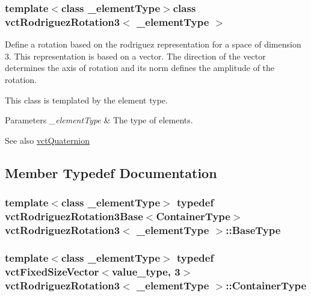 \subsubsection*{template$<$class \+\_\+element\+Type$>$class vct\+Rodriguez\+Rotation3$<$ \+\_\+element\+Type $>$}

Define a rotation based on the rodriguez representation for a space of dimension 3. This representation is based on a vector. The direction of the vector determines the axis of rotation and its norm defines the amplitude of the rotation. 

This class is templated by the element type.


\begin{DoxyParams}{Parameters}
{\em \+\_\+element\+Type} & The type of elements.\\
\hline
\end{DoxyParams}
\begin{DoxySeeAlso}{See also}
\hyperlink{classvct_quaternion}{vct\+Quaternion} 
\end{DoxySeeAlso}


\subsection{Member Typedef Documentation}
\hypertarget{classvct_rodriguez_rotation3_a9808e8703a58127607921c08914bda40}{}
\subsubsection[{Base\+Type}]{\setlength{\rightskip}{0pt plus 5cm}template$<$class \+\_\+element\+Type$>$ typedef {\bf vct\+Rodriguez\+Rotation3\+Base}$<${\bf Container\+Type}$>$ {\bf vct\+Rodriguez\+Rotation3}$<$ \+\_\+element\+Type $>$\+::{\bf Base\+Type}}\label{classvct_rodriguez_rotation3_a9808e8703a58127607921c08914bda40}
\hypertarget{classvct_rodriguez_rotation3_a14522bb406d3c5c520025d6f1c5f0a82}{}
\subsubsection[{Container\+Type}]{\setlength{\rightskip}{0pt plus 5cm}template$<$class \+\_\+element\+Type$>$ typedef {\bf vct\+Fixed\+Size\+Vector}$<$value\+\_\+type, 3$>$ {\bf vct\+Rodriguez\+Rotation3}$<$ \+\_\+element\+Type $>$\+::{\bf Container\+Type}}\label{classvct_rodriguez_rotation3_a14522bb406d3c5c520025d6f1c5f0a82}
\hypertarget{classvct_rodriguez_rotation3_ae212ce4b566eec4c0083226a64ffd0de}{}
